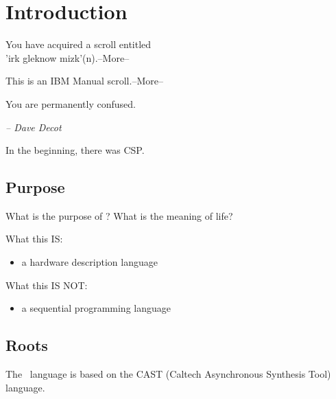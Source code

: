 
\chapter{Introduction}
\label{sec:intro}

\begin{flushright}
{ \ttfamily
You have acquired a scroll entitled\\
'irk gleknow mizk'(n).--More--

\medskip
This is an IBM Manual scroll.--More--

\medskip
You are permanently confused.

\bigskip
}	%
{\itshape -- Dave Decot}
\end{flushright}


In the beginning, there was CSP\cite{ref:csp}.


\section{Purpose}
\label{sec:intro:purpose}

What is the purpose of \artxx?
What is the meaning of life?

What this IS:
\begin{itemize}
\item a hardware description language
\end{itemize}

What this IS NOT:
\begin{itemize}
\item a sequential programming language
\end{itemize}

\section{Roots}
\label{sec:intro:roots}

The \artxx\ language is based on the CAST
(Caltech Asynchronous Synthesis Tool) language.  

